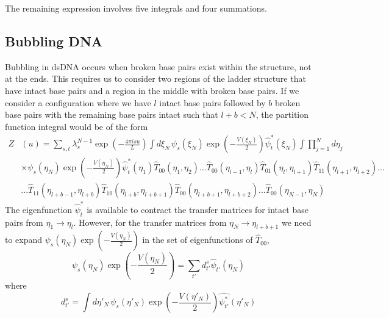 %
The remaining expression involves five integrals and four summations.

\subsection{Bubbling DNA}
%
Bubbling in dsDNA occurs when broken base pairs exist within the structure, not at the ends. This requires us to consider two regions of the ladder structure that have intact base pairs and a region in the middle with broken base pairs. If we consider a configuration where we have $l$ intact base pairs followed by $b$ broken base pairs with the remaining base pairs intact such that $l+b<N$, the partition function integral would be of the form
%
\begin{align}
\label{dna_bubble_1}
Z&\left(u\right)=\sum_{s,t}\lambda_{s}^{N-1}\exp\left(-\frac{4\pi isu}{L}\right)\int d\xi_{N}\,\psi_{s}\left(\xi_{N}\right)\exp\left(-\frac{V\left(\xi_{N}\right)}{2}\right)\hat{\psi}^{*}_{t}\left(\xi_{N}\right)\int\prod_{j=1}^{N}d\eta_{j}\nonumber\\
&\times\psi_{s}\left(\eta_{N}\right)\exp\left(-\frac{V\left(\eta_{N}\right)}{2}\right)\hat{\psi}^{*}_{t}\left(\eta_{1}\right)\hat{T}_{00}\left(\eta_{1},\eta_{2}\right)...\hat{T}_{00}\left(\eta_{l-1},\eta_{l}\right)\hat{T}_{01}\left(\eta_{l},\eta_{l+1}\right)\hat{T}_{11}\left(\eta_{l+1},\eta_{l+2}\right)...\nonumber\\
&...\hat{T}_{11}\left(\eta_{l+b-1},\eta_{l+b}\right)\hat{T}_{10}\left(\eta_{l+b},\eta_{l+b+1}\right)\hat{T}_{00}\left(\eta_{l+b+1},\eta_{l+b+2}\right)...\hat{T}_{00}\left(\eta_{N-1},\eta_{N}\right)
\end{align}
%
The eigenfunction $\hat{\psi}^{*}_{t}$ is available to contract the transfer matrices for intact base pairs from $\eta_{1}\to \eta_{l}$. However, for the transfer matrices from $\eta_{N} \to \eta_{l+b+1}$ we need to expand $\psi_{s}\left(\eta_{N}\right)\exp\left(-\frac{V\left(\eta_{N}\right)}{2}\right)$ in the set of eigenfunctions of $\hat{T}_{00}$,
%
\begin{equation}
\psi_{s}\left(\eta_{N}\right)\exp\left(-\frac{V\left(\eta_{N}\right)}{2}\right) = \sum_{t'}d^{s}_{t'}\hat{\psi}_{t'}\left(\eta_{N}\right)
\end{equation}
%
where
%
\begin{equation}
\label{dna_d_matrix}
d^{s}_{t'}=\int d\eta'_{N}\,\psi_{s}\left(\eta'_{N}\right)\exp\left(-\frac{V\left(\eta'_{N}\right)}{2}\right)\hat{\psi^{*}_{t'}}\left(\eta'_{N}\right)
\end{equation}
